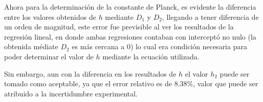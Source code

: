 \documentclass[10pt]{article}
\begin{document}
        Ahora para la determinación de la constante de Planck, es evidente la diferencia entre los valores obtenidos de $h$ mediante $D_1$ y $D_2$, llegando a tener diferencia de un orden de magnitud, este error fue previsible al ver los resultados de la regresión lineal, en donde ambas regresiones contaban con interceptó no nulo (la obtenida médiate $D_2$ es más cercana a $0$) lo cual era condición necesaria para poder determinar el valor de $h$ mediante la ecuación utilizada.

        Sin embargo, aun con la diferencia en los resultados de $h$ el valor $h_2$ puede ser tomado como aceptable, ya que el error relativo es de $8.38\%$, valor que puede ser atribuido a la incertidumbre experimental.
\end{document}
